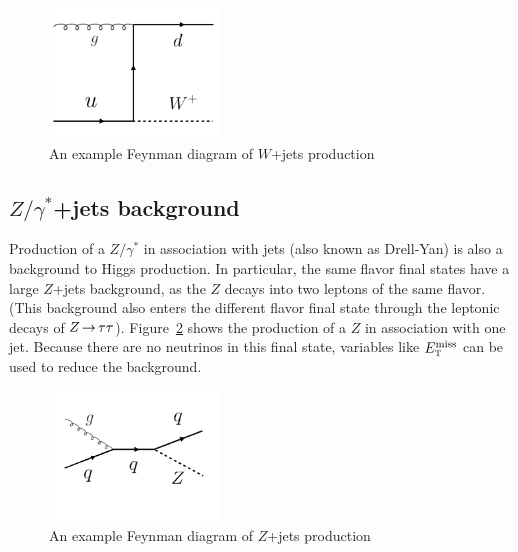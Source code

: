 \begin{figure}[h!]
  \centering
  \captionsetup{justification=centering}

  \includegraphics[width=0.4\textwidth]{figures/Feyn_W}
  \caption{An example Feynman diagram of $W$+jets production}
  \label{fig:Wdiagram}
\end{figure}

\subsection{$Z/\gamma^{*}$+jets background}

Production of a $Z/\gamma^{*}$  in association with jets (also known as Drell-Yan) is also a background to Higgs production. In particular, the same flavor final states have a large $Z$+jets background, as the $Z$ decays into two leptons of the same flavor. (This background also enters the different flavor final state through the leptonic decays of $Z\,{\rightarrow}\,\tau\tau$). Figure~\ref{fig:Zdiagram} shows the production of a $Z$ in association with one jet. Because there are no neutrinos in this final state, variables like $E_{\textrm{\footnotesize\sc t}}^{\rm miss}$ can be used to reduce the background. 

\begin{figure}[h!]
  \centering
  \captionsetup{justification=centering}

  \includegraphics[width=0.4\textwidth]{figures/Feyn_Zjets}
  \caption{An example Feynman diagram of $Z$+jets production}
  \label{fig:Zdiagram}
\end{figure}

